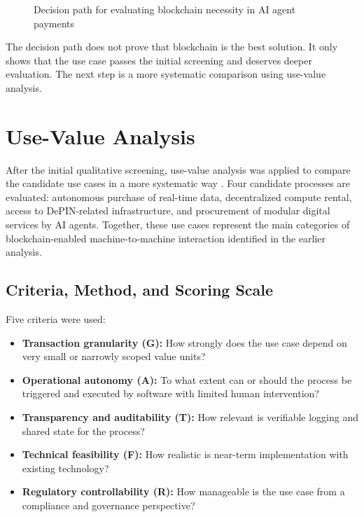 \documentclass[12pt,a4paper,oneside]{article}
\theoremstyle{definition}
\theoremstyle{plain}
\begin{document}
\begin{figure}[H]
\caption{Decision path for evaluating blockchain necessity in AI agent payments}
\label{fig:decisionpath}
\end{figure}

The decision path does not prove that blockchain is the best solution. It only shows that the use case passes the initial screening and deserves deeper evaluation. The next step is a more systematic comparison using use-value analysis.


\section{Use-Value Analysis}

After the initial qualitative screening, use-value analysis was applied to compare the candidate use cases in a more systematic way \citep{krueger2026workshop5}. Four candidate processes are evaluated: autonomous purchase of real-time data, decentralized compute rental, access to DePIN-related infrastructure, and procurement of modular digital services by AI agents. Together, these use cases represent the main categories of blockchain-enabled machine-to-machine interaction identified in the earlier analysis.

\subsection{Criteria, Method, and Scoring Scale}

Five criteria were used:

\begin{itemize}[leftmargin=1.2cm]
\item \textbf{Transaction granularity (G):} How strongly does the use case depend on very small or narrowly scoped value units?
\item \textbf{Operational autonomy (A):} To what extent can or should the process be triggered and executed by software with limited human intervention?
\item \textbf{Transparency and auditability (T):} How relevant is verifiable logging and shared state for the process?
\item \textbf{Technical feasibility (F):} How realistic is near-term implementation with existing technology?
\item \textbf{Regulatory controllability (R):} How manageable is the use case from a compliance and governance perspective?
\end{itemize}
\end{document}
